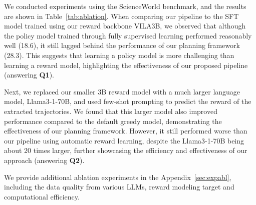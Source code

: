 We conducted experiments using the ScienceWorld benchmark, and the results are shown in Table~\ref{tab:ablation}. When comparing our pipeline to the SFT model trained using our reward backbone VILA3B, we observed that although the policy model trained through fully supervised learning performed reasonably well (18.6), it still lagged behind the performance of our planning framework (28.3). This suggests that learning a policy model is more challenging than learning a reward model, highlighting the effectiveness of our proposed \Model pipeline (answering \textbf{Q1}).

Next, we replaced our smaller 3B reward model with a much larger language model, Llama3-1-70B, and used few-shot prompting to predict the reward of the extracted trajectories. We found that this larger model also improved performance compared to the default greedy model, demonstrating the effectiveness of our planning framework. However, it still performed worse than our pipeline using automatic reward learning, despite the Llama3-1-70B being about 20 times larger, further showcasing the efficiency and effectiveness of our approach (answering \textbf{Q2}).



We provide additional ablation experiments in the Appendix~\ref{sec:expabl}, including the data quality from various LLMs, reward modeling target and computational efficiency.